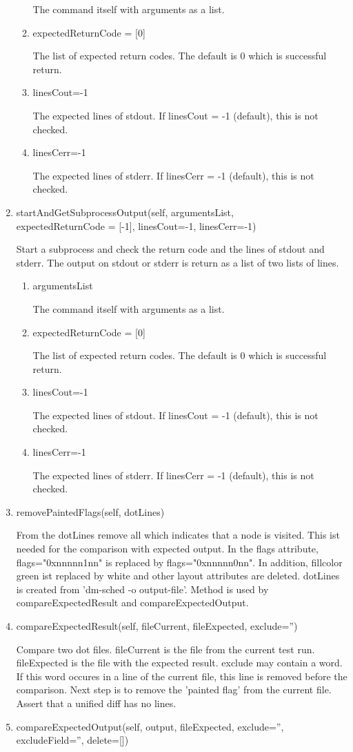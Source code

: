 \documentclass[12pt,a4paper]{report}
\begin{document}
\begin{enumerate}
\begin{enumerate}
The command itself with arguments as a list.
\item expectedReturnCode = [0]

The list of expected return codes. The default is 0 which is successful return.
\item linesCout=-1

The expected lines of stdout. If linesCout = -1 (default), this is not checked.
\item linesCerr=-1

The expected lines of stderr. If linesCerr = -1 (default), this is not checked.
\end{enumerate}
\item startAndGetSubprocessOutput(self, argumentsList, \\
expectedReturnCode = [-1], linesCout=-1, linesCerr=-1)

Start a subprocess and check the return code and the lines of stdout
and stderr. The output on stdout or stderr is return as a list of two
lists of lines.
\begin{enumerate}
\item argumentsList

The command itself with arguments as a list.
\item expectedReturnCode = [0]

The list of expected return codes. The default is 0 which is successful return.
\item linesCout=-1

The expected lines of stdout. If linesCout = -1 (default), this is not checked.
\item linesCerr=-1

The expected lines of stderr. If linesCerr = -1 (default), this is not checked.
\end{enumerate}
\item removePaintedFlags(self, dotLines)

From the dotLines remove all which indicates that a node is visited.
This ist needed for the comparison with expected output. In the flags
attribute, flags="0xnnnnn1nn" is replaced by flags="0xnnnnn0nn". In addition,
fillcolor green ist replaced by white and other layout attributes are
deleted. dotLines is created from 'dm-sched -o output-file'. Method
is used by compareExpectedResult and compareExpectedOutput.
\item compareExpectedResult(self, fileCurrent, fileExpected, exclude='')

Compare two dot files. fileCurrent is the file from the current test run.
fileExpected is the file with the expected result. exclude may contain
a word. If this word occures in a line of the current file, this line is
removed before the comparison. Next step is to remove the 'painted flag'
from the current file. Assert that a unified diff has no lines.
\item compareExpectedOutput(self, output, fileExpected, exclude='', \\
excludeField='', delete=[])


\end{enumerate}
\end{document}
